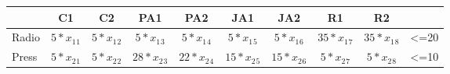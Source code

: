 \documentclass[a4paper,11pt]{scrartcl}
\begin{document}
\begin{tabular}{|l |c| c| c| c| c| c| c| c|c|}
\hline
      &  C1 & C2  &  PA1 & PA2 & JA1 & JA2 & R1 & R2&\\
\hline
Radio &  \begin{math} 5* x_1{}_1 \end{math}  &  \begin{math} 5* x_1{}_2 \end{math}  & \begin{math} 5* x_1{}_3 \end{math}   & \begin{math} 5* x_1{}_4 \end{math}  &  \begin{math} 5* x_1{}_5 \end{math} &  \begin{math} 5* x_1{}_6 \end{math}  &   \begin{math} 35* x_1{}_7 \end{math} &   \begin{math} 35* x_1{}_8 \end{math}&<=20\\

\hline
 Press &  \begin{math} 5* x_2{}_1 \end{math}  &  \begin{math} 5* x_2{}_2 \end{math}  & \begin{math} 28* x_2{}_3 \end{math}   & \begin{math} 22* x_2{}_4 \end{math}  &  \begin{math} 15* x_2{}_5 \end{math} &  \begin{math} 15* x_2{}_6 \end{math}  &   \begin{math} 5* x_2{}_7 \end{math} &   \begin{math} 5* x_2{}_8 \end{math} & <=10\\






\end{tabular}
\end{document}
